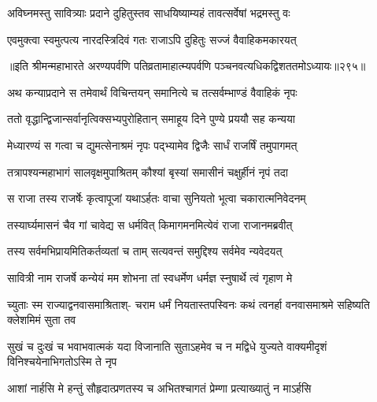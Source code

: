 \begin{center}



\twolineshloka
{अविघ्नमस्तु सावित्र्याः प्रदाने दुहितुस्तव}
{साधयिष्याम्यहं तावत्सर्वेषां भद्रमस्तु वः}




\twolineshloka
{एवमुक्त्वा स्वमुत्पत्य नारदस्त्रिदिवं गतः}
{राजाऽपि दुहितुः सज्जं वैवाहिकमकारयत्}


॥इति श्रीमन्महाभारते अरण्यपर्वणि
पतिव्रतामाहात्म्यपर्वणि पञ्चनवत्यधिकद्विशततमोऽध्यायः॥२९५॥




\twolineshloka
{अथ कन्याप्रदाने स तमेवार्थं विचिन्तयन्}
{समानित्ये च तत्सर्वम्भाण्डं वैवाहिकं नृपः}


\twolineshloka
{ततो वृद्धान्द्विजान्सर्वानृत्विक्सभ्यपुरोहितान्}
{समाहूय दिने पुण्ये प्रययौ सह कन्यया}


\twolineshloka
{मेध्यारण्यं स गत्वा च द्युमत्सेनाश्रमं नृपः}
{पद्भ्यामेव द्विजैः सार्धं राजर्षिं तमुपागमत्}


\twolineshloka
{तत्रापश्यन्महाभागं सालवृक्षमुपाश्रितम्}
{कौश्यां बृस्यां समासीनं चक्षुर्हीनं नृपं तदा}


\twolineshloka
{स राजा तस्य राजर्षेः कृत्वापूजां यथाऽर्हतः}
{वाचा सुनियतो भूत्वा चकारात्मनिवेदनम्}


\twolineshloka
{तस्यार्घ्यमासनं चैव गां चावेद्य स धर्मवित्}
{किमागमनमित्येवं राजा राजानमब्रवीत्}


\twolineshloka
{तस्य सर्वमभिप्रायमितिकर्तव्यतां च ताम्}
{सत्यवन्तं समुद्दिश्य सर्वमेव न्यवेदयत्}


\twolineshloka
{सावित्री नाम राजर्षे कन्येयं मम शोभना}
{तां स्वधर्मेण धर्मज्ञ स्नुषार्थे त्वं गृहाण मे}




\fourlineindentedshloka
{च्युताः स्म राज्याद्वनवासमाश्रिताश्-}
{चराम धर्मं नियतास्तपस्विनः}
{कथं त्वनर्हा वनवासमाश्रमे}
{सहिष्यति क्लेशमिमं सुता तव}




\fourlineindentedshloka
{सुखं च दुःखं च भवाभवात्मकं}
{यदा विजानाति सुताऽहमेव च}
{न मद्विधे युज्यते वाक्यमीदृशं}
{विनिश्चयेनाभिगतोऽस्मि ते नृप}


\twolineshloka
{आशां नार्हसि मे हन्तुं सौहृदात्प्रणतस्य च}
{अभितश्चागतं प्रेम्णा प्रत्याख्यातुं न माऽर्हसि}



\end{center}

